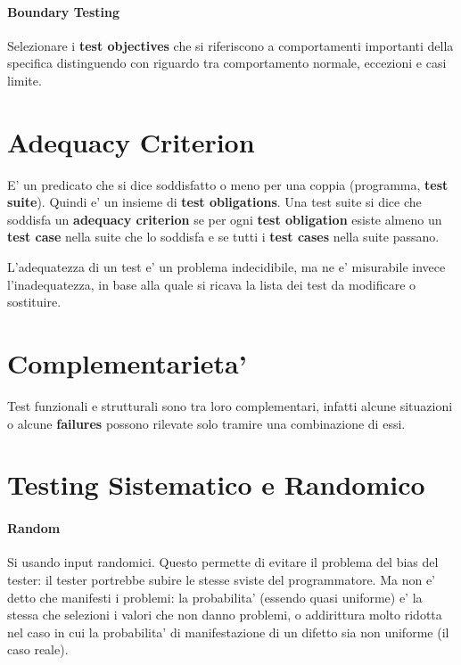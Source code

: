 \paragraph{Boundary Testing}

Selezionare i \textbf{test objectives} che si riferiscono a comportamenti importanti della specifica distinguendo con riguardo tra comportamento normale, eccezioni e casi limite.

\section{Adequacy Criterion}

E' un predicato che si dice soddisfatto o meno per una coppia (programma, \textbf{test suite}).
Quindi e' un insieme di \textbf{test obligations}.
Una test suite si dice che soddisfa un \textbf{adequacy criterion} se per ogni \textbf{test obligation} esiste almeno un \textbf{test case} nella suite che lo soddisfa e se tutti i \textbf{test cases} nella suite passano.

L'adequatezza di un test e' un problema indecidibile, ma ne e' misurabile invece l'inadequatezza, in base alla quale si ricava la lista dei test da modificare o sostituire.

\section{Complementarieta'}

Test funzionali e strutturali sono tra loro complementari, infatti alcune situazioni o alcune \textbf{failures} possono rilevate solo tramire una combinazione di essi.

\section{Testing Sistematico e Randomico}

\paragraph{Random}

Si usando input randomici. Questo permette di evitare il problema del bias del tester: il tester portrebbe subire le stesse sviste del programmatore. Ma non e' detto che manifesti i problemi: la probabilita' (essendo quasi uniforme) e' la stessa che selezioni i valori che non danno problemi, o addirittura molto ridotta nel caso in cui la probabilita' di manifestazione di un difetto sia non uniforme (il caso reale).

